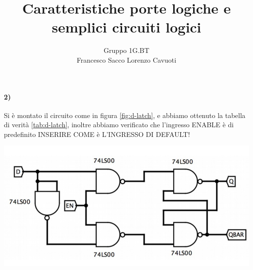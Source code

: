 \documentclass{article}
\date{}
\author{Gruppo 1G.BT \\ Francesco Sacco Lorenzo Cavuoti}
\title{Caratteristiche porte logiche e semplici circuiti logici}
\begin{document}
\maketitle
\paragraph{2)}
	Si è montato il circuito come in figura \ref{fig:d-latch}, e abbiamo ottenuto la tabella di verità \ref{tab:d-latch}, inoltre abbiamo verificato che l'ingresso ENABLE è di predefinito INSERIRE COME è L'INGRESSO DI DEFAULT!\newline
	\begin{minipage}{.6\linewidth}
		\centering
		\includegraphics[width=\linewidth]{immagini/dlach}
		\label{fig:d-latch}
	\end{minipage}
	\begin{minipage}{.4\linewidth}
		
		\label{tab:d-latch}
	\end{minipage}\newline
\end{document}
